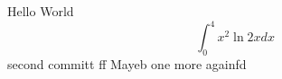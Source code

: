 \documentclass{article}
\begin{document}
Hello World
$$\int_0^4 x^2 \ln{2x}dx$$
second committ  ff
Mayeb
one more
againfd
\end{document}
